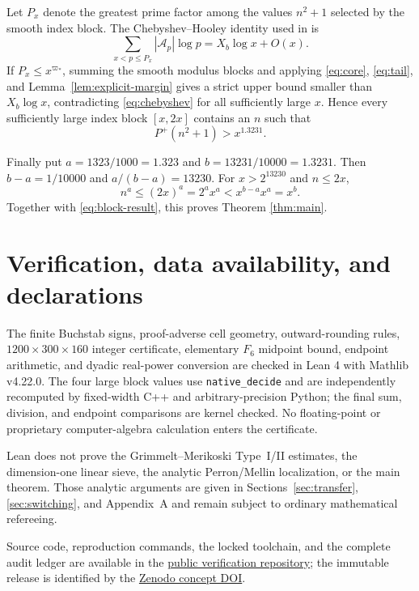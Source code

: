 \documentclass[10pt,reqno]{amsart}
\newcommand{\Pplus}{P^{+}}
\newcommand{\Acal}{\mathcal{A}}
\newcommand{\1}{\mathbf{1}}
\theoremstyle{plain}
\theoremstyle{remark}
\begin{document}
Let $P_x$ denote the greatest prime factor among the values $n^2+1$ selected
by the smooth index block.  The Chebyshev--Hooley identity used in
\cite{Merikoski2020} is
\begin{equation}\label{eq:chebyshev}
 \sum_{x<p\le P_x}|\Acal_p|\log p=X_b\log x+O(x).
\end{equation}
If $P_x\le x^{\varpi_*}$, summing the smooth modulus blocks and applying
\eqref{eq:core}, \eqref{eq:tail}, and Lemma~\ref{lem:explicit-margin} gives a
strict upper bound smaller than $X_b\log x$, contradicting
\eqref{eq:chebyshev} for all sufficiently large $x$.  Hence every
sufficiently large index block $[x,2x]$ contains an $n$ such that
\begin{equation}\label{eq:block-result}
 \Pplus(n^2+1)>x^{1.3231}.
\end{equation}

Finally put $a=1323/1000=1.323$ and
$b=13231/10000=1.3231$.  Then $b-a=1/10000$ and
$a/(b-a)=13230$.  For $x>2^{13230}$ and $n\le2x$,
\[
 n^a\le(2x)^a=2^a x^a<x^{b-a}x^a=x^b.
\]
Together with \eqref{eq:block-result}, this proves Theorem \ref{thm:main}.

\section{Verification, data availability, and declarations}

The finite Buchstab signs, proof-adverse cell geometry, outward-rounding
rules, $1200\times300\times160$ integer certificate, elementary $F_6$
midpoint bound, endpoint arithmetic, and dyadic real-power conversion are
checked in Lean 4 with Mathlib v4.22.0.  The four large block values use
\texttt{native\_decide} and are independently recomputed by fixed-width C++
and arbitrary-precision Python; the final sum, division, and endpoint
comparisons are kernel checked.  No floating-point or proprietary
computer-algebra calculation enters the certificate.

Lean does not prove the Grimmelt--Merikoski Type~I/II estimates, the
dimension-one linear sieve, the analytic Perron/Mellin localization, or the
main theorem.  Those analytic arguments are given in
Sections~\ref{sec:transfer}, \ref{sec:switching}, and Appendix~A and remain
subject to ordinary mathematical refereeing.

Source code, reproduction commands, the locked toolchain, and the complete
audit ledger are available in the
\href{https://github.com/CGandGameEngineLearner/landau-fourth-problem-1.323}
{public verification repository}; the immutable release is identified by the
\href{https://doi.org/10.5281/zenodo.22140874}{Zenodo concept DOI}.
\end{document}
